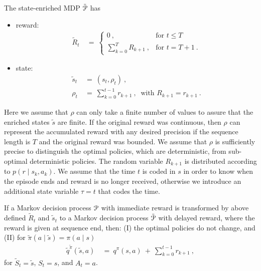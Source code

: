 \documentclass{article}
\renewcommand{\leq}{\leqslant}
\begin{document}
\begin{appendices}
The state-enriched MDP $\tilde{\mathcal{P}}$ has
\begin{itemize}
\item reward:
\begin{align}
  \tilde{R}_t  \ &= \
  \begin{cases}
    0 \ , & \text{for } t \leq T  \\
    \sum_{k=0}^{T}  R_{k+1} \ , & \text{for } t = T+1 \ .
  \end{cases} 
\end{align}
 \item state:
\begin{align}
  \tilde{s}_t \ &= \ (s_t,\rho_t) \ , \\
  \rho_t \ &= \ \sum_{k=0}^{t-1}  r_{k+1} \ , \ \text{ with } R_{k+1}=r_{k+1}\ .
\end{align} 
\end{itemize}
Here we assume that $\rho$ can only take a finite number of values to assure
that the enriched states $\tilde{s}$ are finite. 
If the original reward was continuous, then $\rho$ can represent the accumulated reward 
with any desired precision if the sequence length is $T$ and the original reward was
bounded. We assume that $\rho$ is sufficiently precise to distinguish the 
optimal policies, which are deterministic, from sub-optimal deterministic policies. 
The random variable $R_{k+1}$ is distributed according to
$p(r \mid s_k,a_k)$.
We assume that the time $t$ is coded in $s$ in order to know when the
episode ends and reward is no longer received, otherwise we introduce
an additional state variable $\tau=t$ that codes the time.


\begin{propositionA}
\label{th:AreturnEqu}
If a Markov decision process $\mathcal{P}$ with immediate reward is
transformed by above defined $\tilde{R}_t$ and $\tilde{s}_t$ 
to a Markov decision process $\tilde{\mathcal{P}}$ with delayed
reward, where the reward is given at sequence end, then:
(I) the optimal policies do not change, and (II)
for $\tilde{\pi}(a \mid \tilde{s}) =   \pi(a \mid s)$
\begin{align}
 \tilde{q}^{\tilde{\pi}}(\tilde{s},a) \ &= \ q^\pi(s,a) \ + \
 \sum_{k=0}^{t-1}  r_{k+1} \ ,
\end{align}
for $\tilde{S}_t=\tilde{s}$, $S_t=s$, and $A_t=a$.
\end{propositionA}



\end{appendices}
\end{document}

